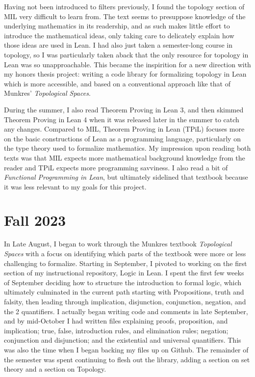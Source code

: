 Having not been introduced to filters previously, I found the
topology section of MIL very difficult to learn from. The text seems 
to presuppose knowledge of the underlying mathematics in its readership,
and as such makes little effort to introduce the mathematical ideas, 
only taking care to delicately explain how those ideas are used in Lean.
I had also just taken a semester-long course in topology, so I was particularly 
taken aback that the only resource for topology in Lean was so unapproachable.
This became the inspirition for a new direction with my honors thesis project:
writing a code library for formalizing topology in Lean which is more accessible,
and based on a conventional approach like that of Munkres' \textit{Topological Spaces}.

During the summer, I also read Theorem Proving in Lean 3, and then
skimmed Theorem Proving in Lean 4 when it was released later in the 
summer to catch any changes. Compared to MIL, Theorem Proving in Lean (TPiL) focuses
more on the basic constructions of Lean as a programming language, particularly
on the type theory used to formalize mathematics. My impression upon reading both
texts was that MIL expects more mathematical background knowledge from the reader
and TPiL expects more programming savviness. I also read a bit of 
\textit{Functional Programming in Lean}, but ultimately sidelined that
textbook because it was less relevant to my goals for this project. 

\section{Fall 2023}

In Late August, I began to work through the Munkres textbook
\textit{Topological Spaces} with a focus on identifying which parts
of the textbook were more or less challenging to formalize. 
Starting in September, I pivoted to working on the first section
of my instructional repository, Logic in Lean. I spent the first few 
weeks of September deciding how to structure the introduction to 
formal logic, which ultimately culminated in the current path
starting with Propositions, truth and falsity, then leading through
implication, disjunction, conjunction, negation, and the 2 quantifiers.
I actually began writing code and comments in late September, and by
mid-October I had written files explaining proofs, proposition, and
implication; true, false, introduction rules, and elimination rules;
negation; conjunction and disjunction; and the existential and 
universal quantifiers. This was also the time when I began backing 
my files up on Github. The remainder of the semester was spent 
continuing to flesh out the library, adding a section on set theory
and a section on Topology.

